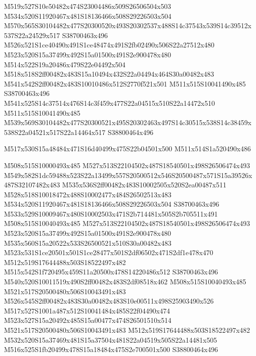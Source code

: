 \documentclass{article}
\begin{document}
\begin{multicols}{2}
M519x527S10e50482x474S23004486x509S26506504x503 M534x520S11920467x481S18136466x508S29226503x504 M570x565S30104482x477S20300520x493S20302537x488S14c37543x539S14c39512x537S22a24529x517 S38700463x496 M526x521S1ce40490x491S1ce48474x491S2fb02490x506S22a27512x480 M523x520S15a37499x492S15a01500x491S2e900478x480 M514x522S19a20486x479S22e04492x504 M518x518S2ff00482x483S15a10494x432S22a04494x464S30a00482x483 M541x542S2ff00482x483S10010486x512S2770f521x501 M511x515S10041490x485 S38700463x496 M541x525S14c37514x476S14c3f459x477S22a04515x510S22a14472x510 M511x515S10041490x485 M539x569S30104482x477S20300521x495S20302463x497S14c30515x538S14c38459x538S22a04521x517S22a14464x517 S38800464x496

\begin{center}
M517x530S15a48484x471S16d40499x475S22b04501x500 M511x514S1a520490x486 
\end{center}


M508x515S10000493x485 M527x513S22104502x487S18540501x498S26506474x493 M549x582S1dc59488x523S22a13499x557S20500512x546S20500487x571S15a39526x487S32107482x483 M535x536S2ff00482x483S10002505x520S2ea00487x511 M528x518S10018472x488S10002477x484S26502513x483 M534x520S11920467x481S18136466x508S29226503x504 S38700463x496 M533x529S10009467x480S10002503x471S2b714481x505S2b705511x491 M508x515S10040493x485 M527x513S22104502x487S18540501x498S26506474x493 M523x520S15a37499x492S15a01500x491S2e900478x480 M535x560S15a20522x533S26500521x510S30a00482x483 M523x531S1ce20501x501S1ce28477x501S2df06502x471S2df1e478x470 M512x519S17644488x503S18522497x482 M515x542S1f720495x459S11a20500x478S14220486x512 S38700463x496 M540x520S10011519x490S2ff00482x483S2df08518x462 M508x515S10040493x485 M521x517S20500480x506S10043491x483 M526x545S2ff00482x483S30a00482x483S10e00511x498S25903490x526 M517x527S1001a487x512S10041484x485S22f04490x474 M523x527S15a20492x485S15a00477x474S26501510x514 M521x517S20500480x506S10043491x483 M512x519S17644488x503S18522497x482 M532x520S15a37469x481S15a37504x481S22a04519x505S22a14481x505 M516x525S1fb20499x478S15a18484x475S2e700501x500 S38800464x496


\end{multicols}
\end{document}
